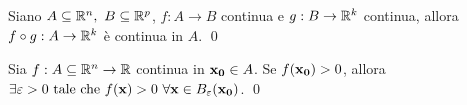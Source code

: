 \begin{theorem}
    Siano $A \subseteq \mathbb{R}^n, \ B \subseteq \mathbb{R}^p$, $f: A \to B$ continua e $g: B \to \mathbb{R}^k$ continua, allora $f\circ g: A \to \mathbb{R}^k$ è continua in $A$.
    \qed
\end{theorem}

\begin{theorem}
    \label{thm:sign}
    Sia $f: A \subseteq \mathbb{R}^n \to \mathbb{R}$ continua in $\vb{x_0}\in A$. Se $f(\vb{x_0})>0$, allora $\exists \varepsilon > 0 \tc f(\vb{x}) > 0 \ \forall \vb{x} \in B_\varepsilon(\vb{x_0})$.
    \qed
\end{theorem}